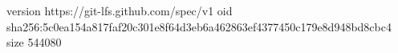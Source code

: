 version https://git-lfs.github.com/spec/v1
oid sha256:5c0ea154a817faf20c301e8f64d3eb6a462863ef4377450c179e8d948bd8cbc4
size 544080
